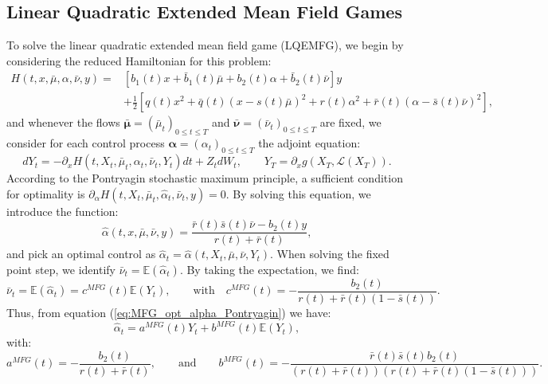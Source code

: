 \documentclass[11pt]{article}
\def\balpha{\boldsymbol{\alpha}}
\def\bmubar{\boldsymbol{\bar{\mu}}}
\def\bnubar{\boldsymbol{\bar{\nu}}}
\newcommand\cL{\mathcal L}
\begin{document}
\subsection{\textbf{Linear Quadratic Extended Mean Field Games}}\label{sec:EMFG}
To solve the linear quadratic extended mean field game (LQEMFG), we begin by considering the reduced Hamiltonian for this problem:
\begin{equation*}
\begin{split}
    H(t,x,\bar{\mu},\alpha,\bar{\nu},y)=&\left[b_1(t)x+\bar{b}_1(t)\bar{\mu}+b_2(t) \alpha+\bar{b}_2(t)\bar{\nu}\right]y \\
    &+\frac{1}{2}\left[q(t)x^2+\bar{q}(t)(x-s(t)\bar{\mu})^2 +r(t)\alpha^2+\bar{r}(t)(\alpha-\bar{s}(t)\bar{\nu})^2\right],
\end{split}
\end{equation*}
and whenever the flows $\bmubar=(\bar{\mu}_t)_{0\leq t\leq T}$ and $\bnubar=(\bar{\nu}_t)_{0\leq t\leq T}$ are fixed, we consider for each control process $\balpha=(\alpha_t)_{0\leq t\leq T}$ the adjoint equation:
\begin{equation*}
    dY_t=- \partial_x H(t,X_t,\bar{\mu}_t,\alpha_t,\bar{\nu}_t,Y_t)dt+Z_tdW_t,
    \qquad
    Y_T=\partial_xg(X_T, \cL(X_T)).
\end{equation*}
According to the Pontryagin stochastic maximum principle, a sufficient condition for optimality is $\partial_{\alpha}H(t,X_t,\bar{\mu}_t,\hat{\alpha}_t,\bar{\nu}_t,y)=0$. By solving this equation, we introduce the function:
\begin{equation}
    \hat{\alpha}(t,x,\bar{\mu},\bar{\nu},y)=\frac{\bar{r}(t)\bar{s}(t)\bar{\nu}-b_2(t)y}{r(t)+\bar{r}(t)},
\label{eq:MFG_opt_alpha_Pontryagin}
\end{equation}
and pick an optimal control as $\hat{\alpha}_t=\hat{\alpha}(t,X_t,\bar{\mu},\bar{\nu},Y_t)$. When solving the fixed point step, we identify $\bar{\nu}_t=\mathbb{E}(\hat{\alpha}_t)$. By taking the expectation, we find:
\begin{equation*}
    \bar{\nu}_t = \mathbb{E}(\hat{\alpha}_t)=c^{MFG}(t)\mathbb{E}(Y_t),
	\qquad 
	\text{with} 
	\quad
    c^{MFG}(t)=-\frac{b_2(t)}{r(t)+\bar{r}(t)(1-\bar{s}(t))}.
\end{equation*}
Thus, from equation (\ref{eq:MFG_opt_alpha_Pontryagin}) we have:
\begin{equation}
    \hat{\alpha}_t=a^{MFG}(t) Y_t+b^{MFG}(t)\mathbb{E}(Y_t),
\label{eq:MFG_opt_alpha_Y_expY}
\end{equation}
with:
\begin{equation*}
	a^{MFG}(t)=-\frac{b_2(t)}{r(t)+\bar{r}(t)},
	\qquad
	\text{and}
	\qquad
	b^{MFG}(t)=-\frac{\bar{r}(t)\bar{s}(t)b_2(t)}{(r(t)+\bar{r}(t))(r(t)+\bar{r}(t)(1-\bar{s}(t)))}.
\end{equation*}
\end{document}
